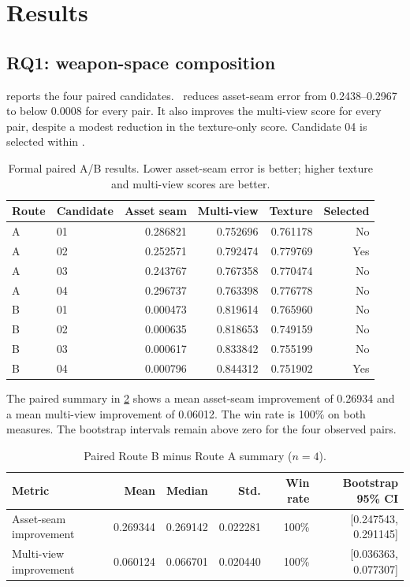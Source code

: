 \section{Results}
\label{sec:results}

\subsection{RQ1: weapon-space composition}

 reports the four paired candidates. \routeB\ reduces
asset-seam error from 0.2438--0.2967 to below 0.0008 for every pair. It also
improves the multi-view score for every pair, despite a modest reduction in the
texture-only score. Candidate 04 is selected within \routeB.

\begin{table}[t]
  \centering
  \caption{Formal paired A/B results. Lower asset-seam error is better; higher
  texture and multi-view scores are better.}
  \label{tab:formal-candidates}
  \small
  \begin{tabular}{llrrrr}
    \toprule
    Route & Candidate & Asset seam & Multi-view & Texture & Selected\\
    \midrule
    A & 01 & 0.286821 & 0.752696 & 0.761178 & No\\
    A & 02 & 0.252571 & 0.792474 & 0.779769 & Yes\\
    A & 03 & 0.243767 & 0.767358 & 0.770474 & No\\
    A & 04 & 0.296737 & 0.763398 & 0.776778 & No\\
    \midrule
    B & 01 & 0.000473 & 0.819614 & 0.765960 & No\\
    B & 02 & 0.000635 & 0.818653 & 0.749159 & No\\
    B & 03 & 0.000617 & 0.833842 & 0.755199 & No\\
    B & 04 & 0.000796 & 0.844312 & 0.751902 & Yes\\
    \bottomrule
  \end{tabular}
\end{table}

The paired summary in \cref{tab:paired-summary} shows a mean asset-seam
improvement of 0.26934 and a mean multi-view improvement of 0.06012. The win rate
is 100\% on both measures. The bootstrap intervals remain above zero for the four
observed pairs.

\begin{table}[t]
  \centering
  \caption{Paired Route B minus Route A summary ($n=4$).}
  \label{tab:paired-summary}
  \small
  \begin{tabular}{lrrrrr}
    \toprule
    Metric & Mean & Median & Std. & Win rate & Bootstrap 95\% CI\\
    \midrule
    Asset-seam improvement & 0.269344 & 0.269142 & 0.022281 & 100\% &
    [0.247543, 0.291145]\\
    Multi-view improvement & 0.060124 & 0.066701 & 0.020440 & 100\% &
    [0.036363, 0.077307]\\
    \bottomrule
  \end{tabular}
\end{table}

